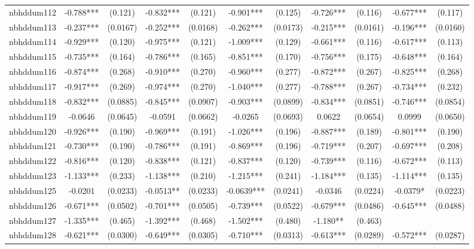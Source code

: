 \documentclass[]{article}
\begin{document}
\begin{tabular}{lcccccccccc}
nbhddum112 & -0.788*** & (0.121) & -0.832*** & (0.121) & -0.901*** & (0.125) & -0.726*** & (0.116) & -0.677*** & (0.117) \\
nbhddum113 & -0.237*** & (0.0167) & -0.252*** & (0.0168) & -0.262*** & (0.0173) & -0.215*** & (0.0161) & -0.196*** & (0.0160) \\
nbhddum114 & -0.929*** & (0.120) & -0.975*** & (0.121) & -1.009*** & (0.129) & -0.661*** & (0.116) & -0.617*** & (0.113) \\
nbhddum115 & -0.735*** & (0.164) & -0.786*** & (0.165) & -0.851*** & (0.170) & -0.756*** & (0.175) & -0.648*** & (0.164) \\
nbhddum116 & -0.874*** & (0.268) & -0.910*** & (0.270) & -0.960*** & (0.277) & -0.872*** & (0.267) & -0.825*** & (0.268) \\
nbhddum117 & -0.917*** & (0.269) & -0.974*** & (0.270) & -1.040*** & (0.277) & -0.788*** & (0.267) & -0.734*** & (0.232) \\
nbhddum118 & -0.832*** & (0.0885) & -0.845*** & (0.0907) & -0.903*** & (0.0899) & -0.834*** & (0.0851) & -0.746*** & (0.0854) \\
nbhddum119 & -0.0646 & (0.0645) & -0.0591 & (0.0662) & -0.0265 & (0.0693) & 0.0622 & (0.0654) & 0.0999 & (0.0650) \\
nbhddum120 & -0.926*** & (0.190) & -0.969*** & (0.191) & -1.026*** & (0.196) & -0.887*** & (0.189) & -0.801*** & (0.190) \\
nbhddum121 & -0.730*** & (0.190) & -0.786*** & (0.191) & -0.869*** & (0.196) & -0.719*** & (0.207) & -0.697*** & (0.208) \\
nbhddum122 & -0.816*** & (0.120) & -0.838*** & (0.121) & -0.837*** & (0.120) & -0.739*** & (0.116) & -0.672*** & (0.113) \\
nbhddum123 & -1.133*** & (0.233) & -1.138*** & (0.210) & -1.215*** & (0.241) & -1.184*** & (0.135) & -1.114*** & (0.135) \\
nbhddum125 & -0.0201 & (0.0233) & -0.0513** & (0.0233) & -0.0639*** & (0.0241) & -0.0346 & (0.0224) & -0.0379* & (0.0223) \\
nbhddum126 & -0.671*** & (0.0502) & -0.701*** & (0.0505) & -0.739*** & (0.0522) & -0.679*** & (0.0486) & -0.645*** & (0.0488) \\
nbhddum127 & -1.335*** & (0.465) & -1.392*** & (0.468) & -1.502*** & (0.480) & -1.180** & (0.463) &  &  \\
nbhddum128 & -0.621*** & (0.0300) & -0.649*** & (0.0305) & -0.710*** & (0.0313) & -0.613*** & (0.0289) & -0.572*** & (0.0287) \\

\end{tabular}
\end{document}
